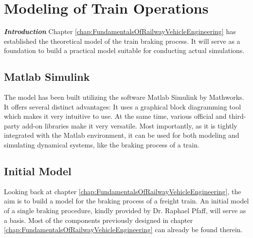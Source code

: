 \chapter{Modeling of Train Operations}
\label{chap:ModelingOfTrainOperations}
\par\noindent
\textit{\textbf{Introduction}} Chapter \ref{chap:FundamentalsOfRailwayVehicleEngineering} has established the theoretical model of the train braking process. It will serve as a foundation to build a practical model suitable for conducting actual simulations. 

\section{Matlab Simulink}
\label{sec:MatlabSimulink}
The model has been built utilizing the software Matlab Simulink by Mathworks. It offers several distinct advantages: It uses a graphical block diagramming tool which makes it very intuitive to use. At the same time, various official and third-party add-on libraries make it very versatile. Most importantly, as it is tightly integrated with the Matlab environment, it can be used for both modeling and simulating dynamical systems, like the braking process of a train.

\section{Initial Model}
\label{sec:InitialModel}
\par\noindent
Looking back at chapter \ref{chap:FundamentalsOfRailwayVehicleEngineering}, the aim is to build a model for the braking process of a freight train. An initial model of a single braking procedure, kindly provided by Dr. Raphael Pfaff, will serve as a basis. Most of the components previously designed in chapter \ref{chap:FundamentalsOfRailwayVehicleEngineering} can already be found therein.  

